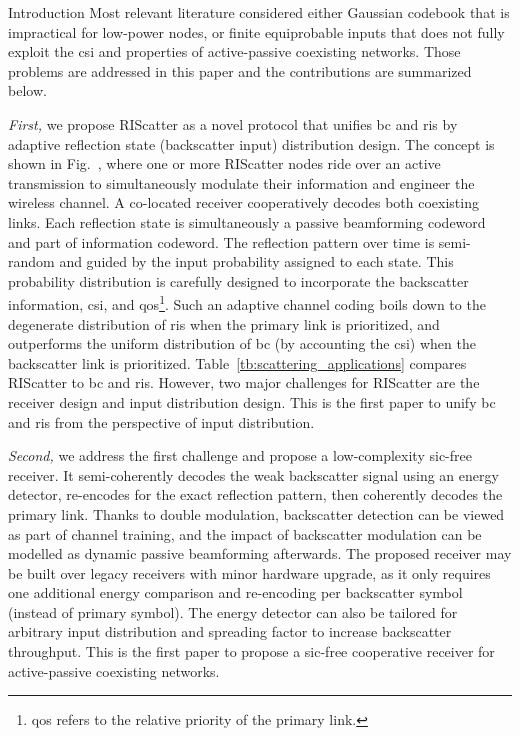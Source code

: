 \documentclass[journal]{IEEEtran}
\begin{document}
\begin{section}{Introduction}
	Most relevant literature considered either Gaussian codebook \cite{Guo2019b,Ding2020,Long2020a,Zhou2019a,Wu2021a,Xu2021a,Yang2021a,Hu2021b} that is impractical for low-power nodes, or finite equiprobable inputs \cite{Yang2018,Liang2020,Han2021,Zhang2022,Liu2019d,Bereyhi2020,Xu2020b,Zhang2021d,Hua2022,Basar2020,Ma2020a,Yuan2021,Hu2021a} that does not fully exploit the \gls{csi} and properties of active-passive coexisting networks.
	Those problems are addressed in this paper and the contributions are summarized below.

	\emph{First,} we propose RIScatter as a novel protocol that unifies \gls{bc} and \gls{ris} by adaptive reflection state (backscatter input) distribution design.
	The concept is shown in Fig.~, where one or more RIScatter nodes ride over an active transmission to simultaneously modulate their information and engineer the wireless channel.
	A co-located receiver cooperatively decodes both coexisting links.
	Each reflection state is simultaneously a passive beamforming codeword and part of information codeword.
	The reflection pattern over time is semi-random and guided by the input probability assigned to each state.
	This probability distribution is carefully designed to incorporate the backscatter information, \gls{csi}, and \gls{qos}\footnote{\gls{qos} refers to the relative priority of the primary link.\label{fn:qos}}.
	Such an adaptive channel coding boils down to the degenerate distribution of \gls{ris} when the primary link is prioritized, and outperforms the uniform distribution of \gls{bc} (by accounting the \gls{csi}) when the backscatter link is prioritized.
	Table~\ref{tb:scattering_applications} compares RIScatter to \gls{bc} and \gls{ris}.
	However, two major challenges for RIScatter are the receiver design and input distribution design.
	This is the first paper to unify \gls{bc} and \gls{ris} from the perspective of input distribution.

	\emph{Second,} we address the first challenge and propose a low-complexity \gls{sic}-free receiver.
	It semi-coherently decodes the weak backscatter signal using an energy detector, re-encodes for the exact reflection pattern, then coherently decodes the primary link.
	Thanks to double modulation, backscatter detection can be viewed as part of channel training, and the impact of backscatter modulation can be modelled as dynamic passive beamforming afterwards.
	The proposed receiver may be built over legacy receivers with minor hardware upgrade, as it only requires one additional energy comparison and re-encoding per backscatter symbol (instead of primary symbol).
	The energy detector can also be tailored for arbitrary input distribution and spreading factor to increase backscatter throughput.
	This is the first paper to propose a \gls{sic}-free cooperative receiver for active-passive coexisting networks.


\end{section}
\end{document}
